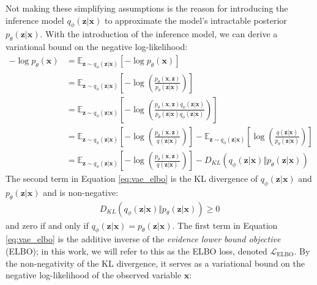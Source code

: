 \documentclass[ oneside,%
                    author={George Herbert},
                    degree={MSci},
                     title={Video Diffusion Models for Climate Simulations},
                  subtitle={}]{dissertation}
\begin{document}
Not making these simplifying assumptions is the reason for introducing the inference model $q_\phi(\mathbf{z}|\mathbf{x})$ to approximate the model's intractable posterior $p_\theta(\mathbf{z}|\mathbf{x})$. With the introduction of the inference model, we can derive a variational bound on the negative log-likelihood:
\begin{align}
      -\log p_\theta(\mathbf{x})&=\mathbb{E}_{\mathbf{z}\sim q_\phi(\mathbf{z}|\mathbf{x})}\left[-\log p_\theta(\mathbf{x})\right]\\
      &=\mathbb{E}_{\mathbf{z}\sim q_\phi(\mathbf{z}|\mathbf{x})}\left[-\log\left(\frac{p_\theta(\mathbf{x},\mathbf{z})}{p_\theta(\mathbf{z}|\mathbf{x})}\right)\right]\\
      &=\mathbb{E}_{\mathbf{z}\sim q_\phi(\mathbf{z}|\mathbf{x})}\left[-\log\left(\frac{p_\theta(\mathbf{x},\mathbf{z})q_\phi(\mathbf{z}|\mathbf{x})}{p_\theta(\mathbf{z}|\mathbf{x})q_\phi(\mathbf{z}|\mathbf{x})}\right)\right]\\
      &=\mathbb{E}_{\mathbf{z}\sim q_\phi(\mathbf{z}|\mathbf{x})}\left[-\log\left(\frac{p_\theta(\mathbf{x},\mathbf{z})}{q(\mathbf{z}|\mathbf{x})}\right)\right]-\mathbb{E}_{\mathbf{z}\sim q_\phi(\mathbf{z}|\mathbf{x})}\left[\log\left(\frac{q(\mathbf{z}|\mathbf{x})}{p_\theta(\mathbf{z}|\mathbf{x})}\right)\right]\\
      &=\mathbb{E}_{\mathbf{z}\sim q_\phi(\mathbf{z}|\mathbf{x})}\left[-\log\left(\frac{p_\theta(\mathbf{x},\mathbf{z})}{q(\mathbf{z}|\mathbf{x})}\right)\right]-D_{KL}(q_\phi(\mathbf{z}|\mathbf{x})\Vert p_\theta(\mathbf{z}|\mathbf{x}))
      \label{eq:vae_elbo}
\end{align}
The second term in Equation \ref{eq:vae_elbo} is the KL divergence of $q_\phi(\mathbf{z}|\mathbf{x})$ and $p_\theta(\mathbf{z}|\mathbf{x})$ and is non-negative:
\begin{align}
      D_{KL}(q_\phi(\mathbf{z}|\mathbf{x})\Vert p_\theta(\mathbf{z}|\mathbf{x}))\ge 0
\end{align}
and zero if and only if $q_\phi(\mathbf{z}|\mathbf{x})=p_\theta(\mathbf{z}|\mathbf{x})$. The first term in Equation \ref{eq:vae_elbo} is the additive inverse of the \textit{evidence lower bound objective} (ELBO); in this work, we will refer to this as the ELBO loss, denoted $\mathcal{L}_{\mathrm{ELBO}}$. By the non-negativity of the KL divergence, it serves as a variational bound on the negative log-likelihood of the observed variable $\mathbf{x}$:
\end{document}
